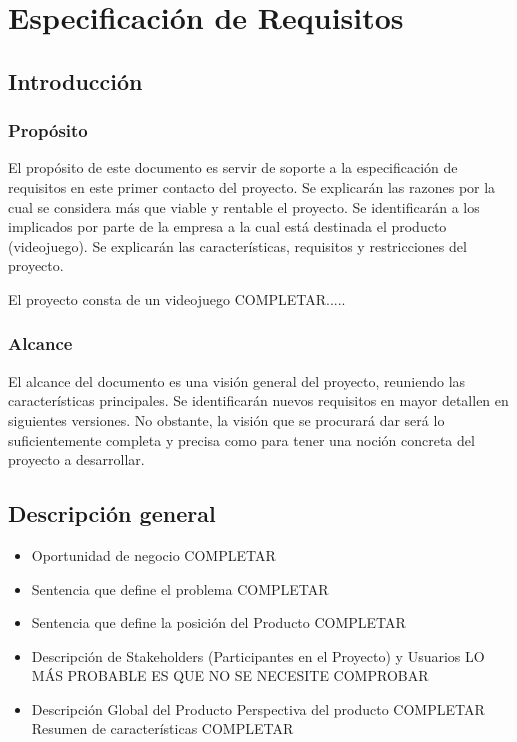 
\section{Especificación de Requisitos}

\subsection{Introducción}
\subsubsection{Propósito}
El propósito de este documento es servir de soporte a la
especificación de requisitos en este primer contacto del proyecto. Se
explicarán las razones por la cual se considera más que viable y
rentable el proyecto. Se identificarán a los implicados por parte de
la empresa a la cual está destinada el producto (videojuego). Se
explicarán las características, requisitos y restricciones del
proyecto.

El proyecto consta de un videojuego COMPLETAR.....

\subsubsection{Alcance}
El alcance del documento es una visión general del proyecto, reuniendo
las características principales. Se identificarán nuevos requisitos en
mayor detallen en siguientes versiones. No obstante, la visión que se
procurará dar será lo suficientemente completa y precisa como para
tener una noción concreta del proyecto a desarrollar.


\subsection{Descripción general}
\begin{itemize}
\item Oportunidad de negocio
  COMPLETAR
\item Sentencia que define el problema
COMPLETAR
\item Sentencia que define la posición del Producto
COMPLETAR
\item Descripción de Stakeholders (Participantes en el Proyecto)
  y Usuarios
  LO MÁS PROBABLE ES QUE NO SE NECESITE COMPROBAR
\item Descripción Global del Producto
  Perspectiva del producto COMPLETAR
  Resumen de características COMPLETAR

\end{itemize}

